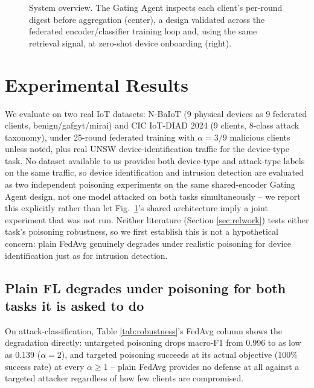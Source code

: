 \documentclass[conference]{IEEEtran}
\begin{document}
\begin{figure}[t]
    \centering
    \resizebox{\textwidth}{!}{}
    \caption{System overview. The Gating Agent inspects each client's per-round digest before aggregation (center), a design validated across the federated encoder/classifier training loop and, using the same retrieval signal, at zero-shot device onboarding (right).}
    \label{system}
\end{figure}

\section{Experimental Results}
\label{sec:results}
We evaluate on two real IoT datasets: N-BaIoT \cite{meidan2018nbaiot} (9 physical devices as 9 federated clients, benign/gafgyt/mirai) and CIC IoT-DIAD 2024 (9 clients, 8-class attack taxonomy), under 25-round federated training with $\alpha{=}3/9$ malicious clients unless noted, plus real UNSW device-identification traffic \cite{sivanathan2018classifying} for the device-type task. No dataset available to us provides both device-type and attack-type labels on the same traffic, so device identification and intrusion detection are evaluated as two independent poisoning experiments on the same shared-encoder Gating Agent design, not one model attacked on both tasks simultaneously -- we report this explicitly rather than let Fig.~\ref{system}'s shared architecture imply a joint experiment that was not run. Neither literature (Section \ref{sec:relwork}) tests either task's poisoning robustness, so we first establish this is not a hypothetical concern: plain FedAvg genuinely degrades under realistic poisoning for device identification just as for intrusion detection.

\subsection{Plain FL degrades under poisoning for both tasks it is asked to do}
On attack-classification, Table \ref{tab:robustness}'s FedAvg column shows the degradation directly: untargeted poisoning drops macro-F1 from 0.996 to as low as 0.139 ($\alpha{=}2$), and targeted poisoning succeeds at its actual objective (100\% success rate) at every $\alpha \geq 1$ -- plain FedAvg provides no defense at all against a targeted attacker regardless of how few clients are compromised.
\end{document}

